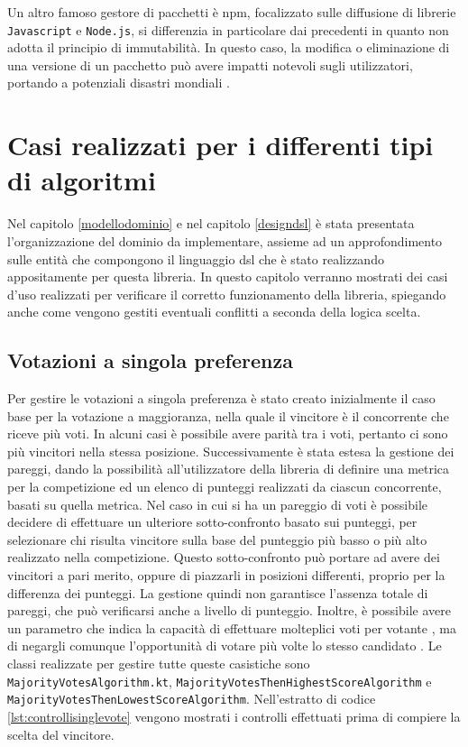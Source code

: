 \documentclass[12pt,a4paper,openright,twoside]{book}
\begin{document}
Un altro famoso gestore di pacchetti è \ac{npm}, focalizzato sulle diffusione di librerie \texttt{Javascript} e \texttt{Node.js},
si differenzia in particolare dai precedenti in quanto non adotta il principio di immutabilità.
In questo caso, la modifica o eliminazione di una versione di un pacchetto può avere impatti notevoli sugli utilizzatori,
portando a potenziali disastri mondiali \cite{NPMChaos}.

\section{Casi realizzati per i differenti tipi di algoritmi}

Nel capitolo \ref{modellodominio} e nel capitolo \ref{designdsl} è stata presentata l'organizzazione del dominio
da implementare, assieme ad un approfondimento sulle entità che compongono il linguaggio \ac{dsl}
che è stato realizzando appositamente per questa libreria.
In questo capitolo verranno mostrati dei casi d'uso realizzati per verificare il corretto funzionamento della libreria,
spiegando anche come vengono gestiti eventuali conflitti a seconda della logica scelta.

\subsection{Votazioni a singola preferenza}
Per gestire le votazioni a singola preferenza è stato creato inizialmente il caso base per la votazione a maggioranza,
nella quale il vincitore è il concorrente che riceve più voti. In alcuni casi è possibile avere parità tra i voti, pertanto
ci sono più vincitori nella stessa posizione. 
Successivamente è stata estesa la gestione dei pareggi, dando la possibilità all'utilizzatore della libreria di definire 
una metrica per la competizione ed un elenco di punteggi realizzati da ciascun concorrente, basati su quella metrica.
Nel caso in cui si ha un pareggio di voti è possibile decidere di effettuare un ulteriore sotto-confronto basato sui punteggi,
per selezionare chi risulta vincitore sulla base del punteggio più basso o più alto realizzato nella competizione.
Questo sotto-confronto può portare ad avere dei vincitori a pari merito, oppure di piazzarli in posizioni differenti, proprio
per la differenza dei punteggi.
La gestione quindi non garantisce l'assenza totale di pareggi, che può verificarsi anche a livello di punteggio.
Inoltre, è possibile avere un parametro che indica la capacità di effettuare molteplici voti per votante , ma di negargli
comunque l'opportunità di votare più volte lo stesso candidato .
Le classi realizzate per gestire tutte queste casistiche sono \texttt{MajorityVotesAlgorithm.kt}, \texttt{MajorityVotesThenHighestScoreAlgorithm}
e \texttt{MajorityVotesThenLowestScoreAlgorithm}. Nell'estratto di codice \ref{lst:controllisinglevote} vengono mostrati i controlli effettuati prima di 
compiere la scelta del vincitore.
\end{document}
